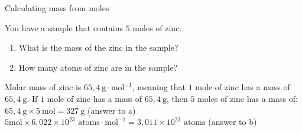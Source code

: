       \begin{wex}{Calculating mass from moles }{
      \label{m38717*id276928}You have a sample that contains $5$ moles of zinc.
      \label{m38717*id276934}\begin{enumerate}[noitemsep, label=\textbf{\alph*}. ] 
            \label{m38717*uid12}\item What is the mass of the zinc in the sample?
\label{m38717*uid13}\item How many atoms of zinc are in the sample?
\end{enumerate}
}
{
      \label{m38717*id276984}Molar mass of zinc is $65,4 ~\text{g} \cdot \text{mol}^{-1}$, meaning that $1$ mole of zinc has a mass of $65,4 ~\text{g}$.
      \label{m38717*id277021}If $1$ mole of zinc has a mass of $65,4 ~\text{g}$, then $5$ moles of zinc has a mass of: $65,4 ~\text{g} \times 5 ~\text{mol}=327 ~\text{g}$ (answer to a) 
$5 \text{mol} \times 6,022 \times {10}^{23} \text{ atoms} \cdot \text{mol}^{-1} = 3,011 \times {10}^{23} \text{ atoms}$
      \label{m38717*id277263}(answer to b)
}
    \end{wex}
    \noindent 
\label{m38717*secfhsst!!!underscore!!!id305}
